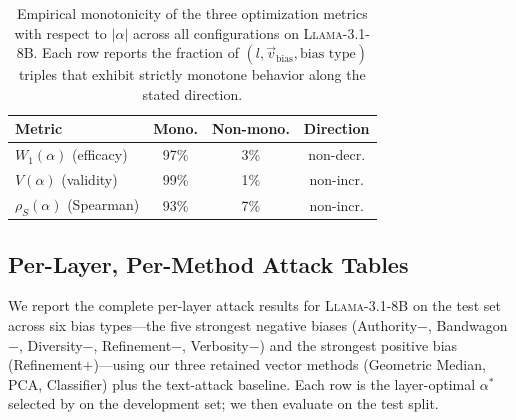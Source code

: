 \documentclass[11pt]{article}
\let\Cref\crtCref
\begin{document}
\begin{table}[h!]
\centering
\small
\setlength{\tabcolsep}{3pt}
\caption{Empirical monotonicity of the three optimization metrics with respect to $|\alpha|$ across all configurations on \textsc{Llama-3.1-8B}. Each row reports the fraction of $(l, \vec{v}_{\text{bias}}, \text{bias type})$ triples that exhibit strictly monotone behavior along the stated direction.}
\label{tab:alpha_monotone}
\begin{tabular}{l ccc}
\toprule
\textbf{Metric} & \textbf{Mono.} & \textbf{Non-mono.} & \textbf{Direction} \\
\midrule
$W_1(\alpha)$ (efficacy) & 97\% & 3\% & non-decr. \\
$V(\alpha)$ (validity) & 99\% & 1\% & non-incr. \\
$\rho_S(\alpha)$ (Spearman) & 93\% & 7\% & non-incr. \\
\bottomrule
\end{tabular}
\end{table}

\subsection{Per-Layer, Per-Method Attack Tables}
\label{app:attack_tables}

We report the complete per-layer attack results for \textsc{Llama-3.1-8B} on the test set across six bias types---the five strongest negative biases (Authority$-$, Bandwagon$-$, Diversity$-$, Refinement$-$, Verbosity$-$) and the strongest positive bias (Refinement$+$)---using our three retained vector methods (Geometric Median, PCA, Classifier) plus the text-attack baseline. Each row is the layer-optimal $\alpha^{*}$ selected by \Cref{alg:alpha_search} on the development set; we then evaluate on the test split.
\end{document}
